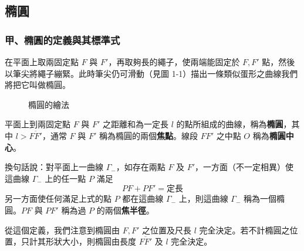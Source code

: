 \subsection{橢圓}
\label{sec:b4s-3-1}

\subsubsection*{甲、橢圓的定義與其標準式}

在平面上取兩固定點 $F$ 與 $F'$，再取夠長的繩子，使兩端能固定於 $F, F'$ 點，然後以筆尖將繩子繃緊。此時筆尖仍可滑動（見圖 1-1）描出一條類似蛋形之曲線我們將把它叫做橢圓。

\begin{figure}[htbp]
\centering
{}
\caption{橢圓的繪法}
\label{fig:b4s-3-1}
\end{figure}

\begin{definition*}
平面上到兩固定點 $F$ 與 $F'$ 之距離和為一定長 $l$ 的點所組成的曲線，稱為\textbf{橢圓}，其中 $l > \overline{FF'}$，通常 $F$ 與 $F'$ 稱為橢圓的兩個\textbf{焦點}。線段 $FF'$ 之中點 $O$ 稱為\textbf{橢圓中心}。

換句話說：對平面上一曲線 $\Gamma_-$，如存在兩點 $F$ 及 $F'$，一方面（不一定相異）使這曲線 $\Gamma_-$ 上的任一點 $P$ 滿足
\begin{equation}
PF + PF' = \text{定長} \label{eq:b4s-3-1-1}
\end{equation}
另一方面使任何滿足上式的點 $P$ 都在這曲線 $\Gamma_-$ 上，則這曲線 $\Gamma_-$ 稱為一個橢圓。$PF$ 與 $PF'$ 稱為過 $P$ 的兩個\textbf{焦半徑}。
\end{definition*}

從這個定義，我們注意到橢圓由 $F, F'$ 之位置及尺長 $l$ 完全決定。若不計橢圓之位置，只計其形狀大小，則橢圓由長度 $\overline{FF'}$ 及 $l$ 完全決定。

